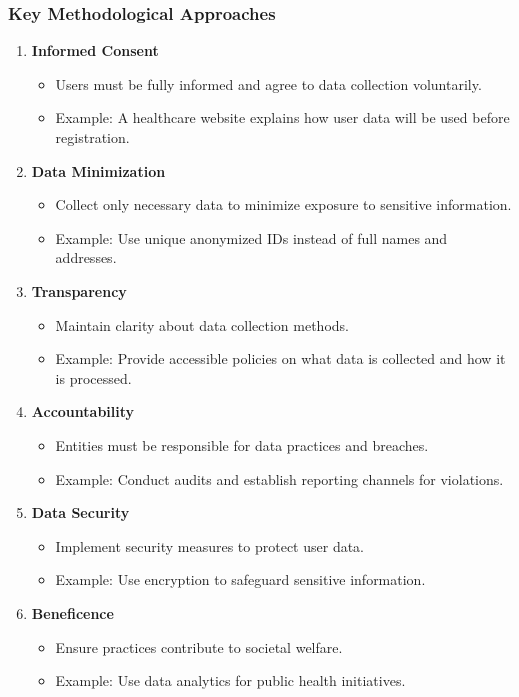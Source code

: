 \documentclass[aspectratio=169]{beamer}
\begin{document}
\begin{frame}[fragile]
    \frametitle{Key Methodological Approaches}
    \begin{enumerate}
        \item \textbf{Informed Consent}
        \begin{itemize}
            \item Users must be fully informed and agree to data collection voluntarily.
            \item Example: A healthcare website explains how user data will be used before registration.
        \end{itemize}
        
        \item \textbf{Data Minimization}
        \begin{itemize}
            \item Collect only necessary data to minimize exposure to sensitive information.
            \item Example: Use unique anonymized IDs instead of full names and addresses.
        \end{itemize}
        
        \item \textbf{Transparency}
        \begin{itemize}
            \item Maintain clarity about data collection methods.
            \item Example: Provide accessible policies on what data is collected and how it is processed.
        \end{itemize}
        
        \item \textbf{Accountability}
        \begin{itemize}
            \item Entities must be responsible for data practices and breaches.
            \item Example: Conduct audits and establish reporting channels for violations.
        \end{itemize}
        
        \item \textbf{Data Security}
        \begin{itemize}
            \item Implement security measures to protect user data.
            \item Example: Use encryption to safeguard sensitive information.
        \end{itemize}
        
        \item \textbf{Beneficence}
        \begin{itemize}
            \item Ensure practices contribute to societal welfare.
            \item Example: Use data analytics for public health initiatives.
        \end{itemize}
    \end{enumerate}
\end{frame}
\end{document}
